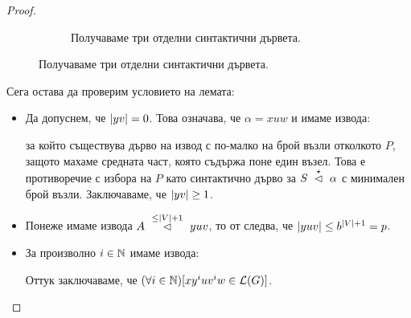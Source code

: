 \begin{proof}
\begin{figure}[H]
\begin{subfigure}[t]{0.3\textwidth}
      \caption{Получаваме три отделни синтактични дървета.}
    \end{subfigure}
  \end{figure}
  Сега остава да проверим условието на лемата:
  \begin{itemize}
  \item
    Да допуснем, че $\abs{yv} = 0$. Това означава, че $\alpha = xuw$ и имаме извода:
    \begin{prooftree}
    \end{prooftree}
    за който съществува дърво на извод с по-малко на брой възли отколкото $P$, защото махаме средната част, която съдържа поне един възел.
    Това е противоречие с избора на $P$ като синтактично дърво за $S \yield{\star}\alpha$ с минимален брой възли.
    Заключаваме, че $\abs{yv} \geq 1$.
  \item
    Понеже имаме извода $A \yield{\leq\abs{V}+1} yuv$, то от  следва, че $\abs{yuv} \leq b^{\abs{V}+1} = p$.
  \item
    За произволно $i\in\Nat$ имаме извода:
    \begin{prooftree}
    \end{prooftree}
    Оттук заключаваме, че $(\forall i \in \Nat)[xy^iuv^iw \in \L(G)]$.
  \end{itemize}
\end{proof}

